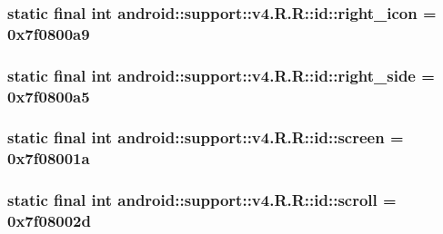 \hypertarget{classandroid_1_1support_1_1v4_1_1_r_1_1id_fb9e2738e55ef731a757110ecd360209}{
\subsubsection[{right\_\-icon}]{\setlength{\rightskip}{0pt plus 5cm}static final int android::support::v4.R.R::id::right\_\-icon = 0x7f0800a9}}
\label{classandroid_1_1support_1_1v4_1_1_r_1_1id_fb9e2738e55ef731a757110ecd360209}


\hypertarget{classandroid_1_1support_1_1v4_1_1_r_1_1id_4fb604ab0f2917cb4b9b23273b8885f6}{
\subsubsection[{right\_\-side}]{\setlength{\rightskip}{0pt plus 5cm}static final int android::support::v4.R.R::id::right\_\-side = 0x7f0800a5}}
\label{classandroid_1_1support_1_1v4_1_1_r_1_1id_4fb604ab0f2917cb4b9b23273b8885f6}


\hypertarget{classandroid_1_1support_1_1v4_1_1_r_1_1id_bf412abfd2174cf1fc73b3c3bf339699}{
\subsubsection[{screen}]{\setlength{\rightskip}{0pt plus 5cm}static final int android::support::v4.R.R::id::screen = 0x7f08001a}}
\label{classandroid_1_1support_1_1v4_1_1_r_1_1id_bf412abfd2174cf1fc73b3c3bf339699}


\hypertarget{classandroid_1_1support_1_1v4_1_1_r_1_1id_43abca5b98b20180f0a269934105252e}{
\subsubsection[{scroll}]{\setlength{\rightskip}{0pt plus 5cm}static final int android::support::v4.R.R::id::scroll = 0x7f08002d}}
\label{classandroid_1_1support_1_1v4_1_1_r_1_1id_43abca5b98b20180f0a269934105252e}


